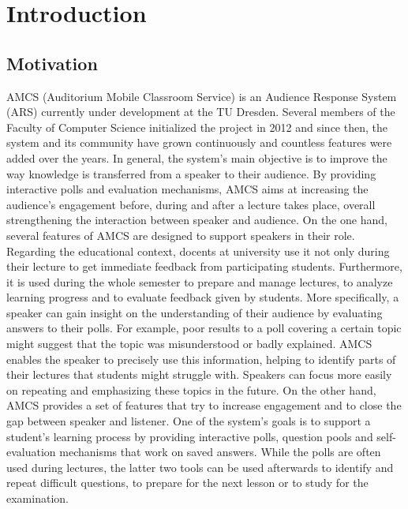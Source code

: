 
\chapter{Introduction}

\section{Motivation}


AMCS (Auditorium Mobile Classroom Service) is an Audience Response System (ARS) currently under development at the TU Dresden. Several members of the Faculty of Computer Science initialized the project in 2012 and since then, the system and its community have grown continuously and countless features were added over the years.
\newline
\newline
In general, the system's main objective is to improve the way knowledge is transferred from a speaker to their audience. By providing interactive polls and evaluation mechanisms, AMCS aims at increasing the audience's engagement before, during and after a lecture takes place, overall strengthening the interaction between speaker and audience.
\newline
\newline
On the one hand, several features of AMCS are designed to support speakers in their role. Regarding the educational context, docents at university use it not only during their lecture to get immediate feedback from participating students. Furthermore, it is used during the whole semester to prepare and manage lectures, to analyze learning progress and to evaluate feedback given by students. More specifically, a speaker can gain insight on the understanding of their audience by evaluating answers to their polls. For example, poor results to a poll covering a certain topic might suggest that the topic was misunderstood or badly explained. AMCS enables the speaker to precisely use  this information, helping to identify parts of their lectures that students might struggle with. Speakers can focus more easily on repeating and emphasizing these topics in the future.
\newline
\newline
On the other hand, AMCS provides a set of features that try to increase engagement and to close the gap between speaker and listener.
One of the system's goals is to support a student's learning process by providing interactive polls, question pools and self-evaluation mechanisms that work on saved answers. While the polls are often used during lectures, the latter two tools can be used afterwards to identify and repeat difficult questions, to prepare for the next lesson or to study for the examination. 
